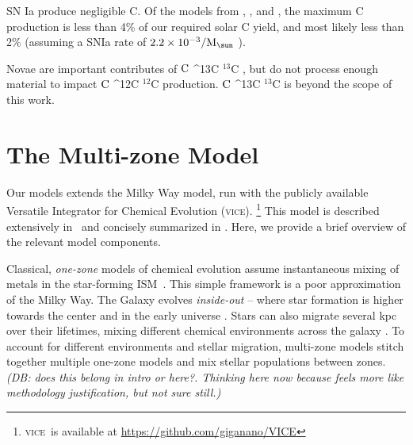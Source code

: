 \documentclass[fleqn,
referee, %
usenatbib]{mnras}
\makeatletter
\newcommand{\JJ}{\citetalias{james+21}}
\newcommand{\VICE}{\textsc{vice}}
\newcommand{\C}[1][\@nil]{
    \def\tmp{#1}%
    \ifx\tmp\@nnil%
        \ensuremath{\rm C}%
    \else%
        \ifmmode ^{#1}{\rm C}%
        \else $^{#1}$C%
        \fi%
\fi }
\newcommand{\Mo}{ {\rm M}_{\sun}}
\newcommand{\dbnote}[1]{ {\color{Thistle} \textit{\small (DB: #1)}} }
\makeatother
\begin{document}
SN Ia produce negligible C. Of the models from \citet{iwamoto+99}, \citet{seitenzahl+13}, and \citet{gronow+21a, gronow+21b}, the maximum C production is less than 4\% of our required solar C yield, and most likely less than 2\% (assuming a SNIa rate of $2.2\times 10^{-3} / \Mo$ \citealt{maoz+mannucci12}).

Novae are important contributes of \C[13], but do not process enough material to impact \C[12] production. \C[13] is beyond the scope of this work.



\section{The Multi-zone Model}\label{sec:vice}

Our models extends the \citet[hereafter \JJ]{james+21} Milky Way model, run with the publicly available Versatile Integrator for Chemical Evolution (\VICE).%
    \footnote{\VICE~is available at \url{https://github.com/giganano/VICE}}
This model is described extensively in \JJ~and concisely summarized  in \citet{james+23}. Here, we provide a brief overview of the relevant model components.

Classical, \textit{one-zone} models of chemical evolution assume instantaneous mixing of metals in the star-forming ISM\ \citep[e.g.][]{matteucci21}. This simple framework is a poor approximation of the Milky Way.  The Galaxy evolves \textit{inside-out} -- where star formation is higher towards the center and in the early universe \citep{WF91, kauffmann96, bird+13}. Stars can also migrate several kpc over their lifetimes, mixing different chemical environments across the galaxy \citep{bird+12,sellwood+binney02}. To account for different environments and stellar migration, multi-zone models stitch together multiple one-zone models and mix stellar populations between zones. \dbnote{does this belong in intro or here?. Thinking here now because feels more like methodology justification, but not sure still.}
\end{document}
